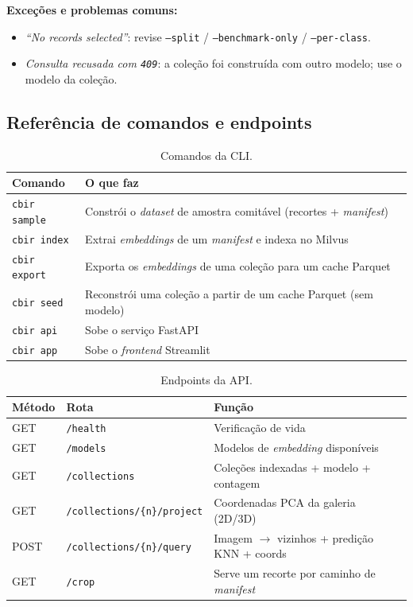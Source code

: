 \documentclass[10pt]{article}
\begin{document}
\noindent\textbf{Exceções e problemas comuns:}
\begin{itemize}
  \item \emph{``No records selected''}: revise \texttt{--split} /
  \texttt{--benchmark-only} / \texttt{--per-class}.
  \item \emph{Consulta recusada com \texttt{409}}: a coleção foi construída com
  outro modelo; use o modelo da coleção.
\end{itemize}

\subsection{Referência de comandos e endpoints}

\begin{table}[H]
\centering
\begin{tabular}{@{}p{2.5cm}p{11.5cm}@{}}
\toprule
\textbf{Comando} & \textbf{O que faz} \\
\midrule
\texttt{cbir sample} & Constrói o \emph{dataset} de amostra comitável (recortes + \emph{manifest}) \\
\texttt{cbir index} & Extrai \emph{embeddings} de um \emph{manifest} e indexa no Milvus \\
\texttt{cbir export} & Exporta os \emph{embeddings} de uma coleção para um cache Parquet \\
\texttt{cbir seed} & Reconstrói uma coleção a partir de um cache Parquet (sem modelo) \\
\texttt{cbir api} & Sobe o serviço FastAPI \\
\texttt{cbir app} & Sobe o \emph{frontend} Streamlit \\
\bottomrule
\end{tabular}
\caption{Comandos da CLI.}
\end{table}

\begin{table}[H]
\centering
\begin{tabular}{@{}llp{7.5cm}@{}}
\toprule
\textbf{Método} & \textbf{Rota} & \textbf{Função} \\
\midrule
GET  & \texttt{/health} & Verificação de vida \\
GET  & \texttt{/models} & Modelos de \emph{embedding} disponíveis \\
GET  & \texttt{/collections} & Coleções indexadas + modelo + contagem \\
GET  & \texttt{/collections/\{n\}/project} & Coordenadas PCA da galeria (2D/3D) \\
POST & \texttt{/collections/\{n\}/query} & Imagem $\rightarrow$ vizinhos + predição KNN + coords \\
GET  & \texttt{/crop} & Serve um recorte por caminho de \emph{manifest} \\
\bottomrule
\end{tabular}
\caption{Endpoints da API.}
\end{table}
\end{document}
